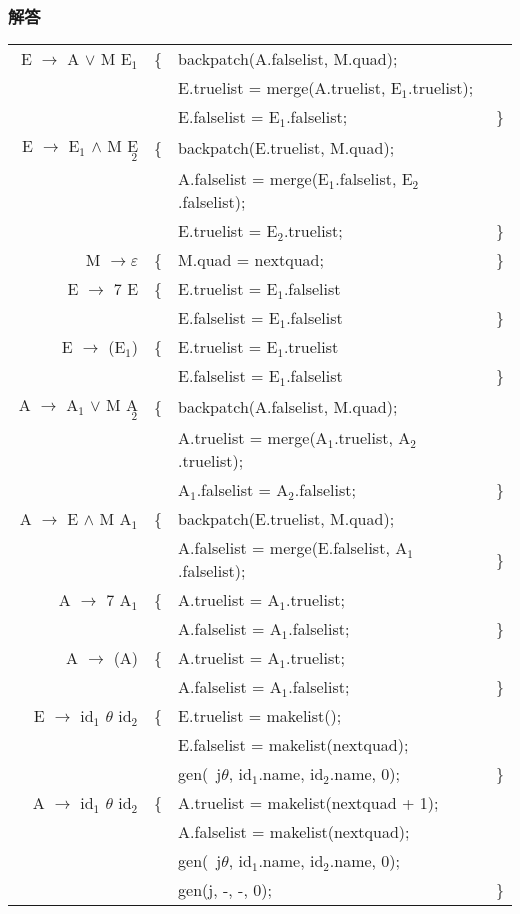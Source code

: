 \subsubsection{解答}
\begin{center}
\begin{longtable}{r|lll}
\toprule
E $\rightarrow$ A $\vee$ M E${}_1$    &  \{ & backpatch(A.falselist, M.quad); & \\
& &    E.truelist = merge(A.truelist, E${}_1$.truelist); & \\
& &    E.falselist = E${}_1$.falselist; & \} \\
\hline
E $\rightarrow$ E${}_1$ $\wedge$ M E${}_2$  &    \{ & backpatch(E.truelist, M.quad); & \\
& &    A.falselist = merge(E${}_1$.falselist, E${}_2$.falselist); & \\
& &    E.truelist = E${}_2$.truelist; & \} \\
\hline
M $\rightarrow \varepsilon$       &    \{ & M.quad = nextquad; & \} \\
\hline
E $\rightarrow$ 7 E      &     \{ & E.truelist = E${}_1$.falselist & \\
& &    E.falselist = E${}_1$.falselist & \} \\
\hline
E $\rightarrow$ (E${}_1$)      &     \{ & E.truelist = E${}_1$.truelist & \\
& &    E.falselist = E${}_1$.falselist & \} \\
\hline
A $\rightarrow$ A${}_1$ $\vee$ M A${}_2$    &  \{ & backpatch(A.falselist, M.quad); & \\
& &    A.truelist = merge(A${}_1$.truelist, A${}_2$.truelist); & \\
& &    A${}_1$.falselist = A${}_2$.falselist; & \} \\
\hline
A $\rightarrow$ E $\wedge$ M A${}_1$  &    \{ & backpatch(E.truelist, M.quad); & \\
& &    A.falselist = merge(E.falselist, A${}_1$.falselist); & \} \\
\hline
A $\rightarrow$ 7 A${}_1$      &     \{ & A.truelist = A${}_1$.truelist; & \\
& &    A.falselist = A${}_1$.falselist; & \} \\
\hline
A $\rightarrow$ (A)      &     \{ & A.truelist = A${}_1$.truelist; & \\
& &    A.falselist = A${}_1$.falselist; & \} \\
\hline
E $\rightarrow$ id${}_1$ $\theta$ id${}_2$  & \{ & E.truelist = makelist(); & \\
& &    E.falselist = makelist(nextquad); & \\
& &    gen(~j$\theta$, id${}_1$.name, id${}_2$.name, 0); & \} \\
\hline
A $\rightarrow$ id${}_1$ $\theta$ id${}_2$ &  \{ & A.truelist = makelist(nextquad + 1); & \\
& &    A.falselist = makelist(nextquad); & \\
& &    gen(~j$\theta$, id${}_1$.name, id${}_2$.name, 0); & \\
& &    gen(j, -, -, 0); & \} \\
\bottomrule
\end{longtable}
\end{center}
